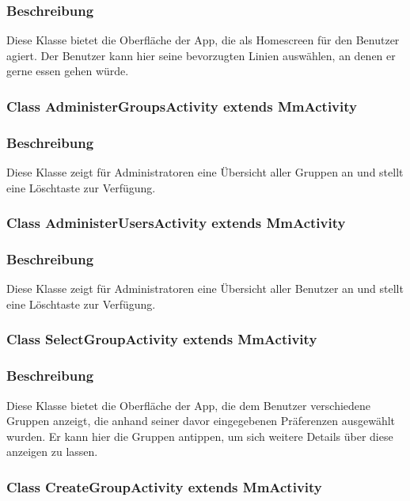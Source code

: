 \documentclass[a4paper]{scrreprt}
\begin{document}
\subsubsection*{Beschreibung}
Diese Klasse bietet die Oberfläche der App, die als Homescreen für den Benutzer agiert. Der Benutzer kann hier seine bevorzugten Linien auswählen, an denen er gerne essen gehen würde.


\subsubsection{Class AdministerGroupsActivity extends MmActivity}
\subsubsection*{Beschreibung}
Diese Klasse zeigt für Administratoren eine Übersicht aller Gruppen an und stellt eine Löschtaste zur Verfügung. 


\subsubsection{Class AdministerUsersActivity extends MmActivity}
\subsubsection*{Beschreibung}
Diese Klasse zeigt für Administratoren eine Übersicht aller Benutzer an und stellt eine Löschtaste zur Verfügung.


\subsubsection{Class SelectGroupActivity extends MmActivity}
\subsubsection*{Beschreibung}
Diese Klasse bietet die Oberfläche der App, die dem Benutzer verschiedene Gruppen anzeigt, die anhand seiner davor eingegebenen Präferenzen ausgewählt wurden. Er kann hier die Gruppen antippen, um sich weitere Details über diese anzeigen zu lassen.


\subsubsection{Class CreateGroupActivity extends MmActivity}
\end{document}
